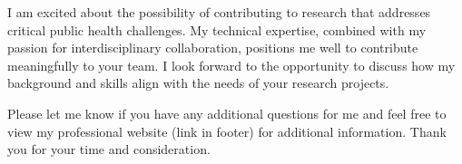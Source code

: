 \documentclass[11pt,a4paper,sans]{moderncv}
\begin{document}
I am excited about the possibility of contributing to research that addresses critical public health challenges. My technical expertise, combined with my passion for interdisciplinary collaboration, positions me well to contribute meaningfully to your team. I look forward to the opportunity to discuss how my background and skills align with the needs of your research projects.

Please let me know if you have any additional questions for me and feel free to view my professional website (link in footer) for additional information. Thank you for your time and consideration.\\
	
	\vspace{2mm}
	
	\makeletterclosing
	
\end{document}
